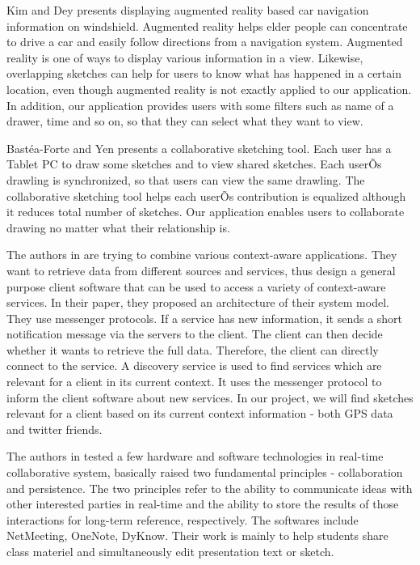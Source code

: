 \documentclass{www2010-submission}
\begin{document}
Kim and Dey \cite{augmented_reality:kim} presents displaying augmented reality
based car navigation information on windshield. Augmented reality helps elder
people can concentrate to drive a car and easily follow directions from a
navigation system. Augmented reality is one of ways to display various
information in a view. Likewise, overlapping sketches can help for users to
know what has happened in a certain location, even though augmented reality is
not exactly applied to our application. In addition, our application provides
users with some filters such as name of a drawer, time and so on, so that they
can select what they want to view.

Bast\'{e}a-Forte and Yen \cite{brainstorming:marcello} presents a collaborative
sketching tool. Each user has a Tablet PC to draw some sketches and to view
shared sketches. Each userÕs drawling is synchronized, so that users can view
the same drawling. The collaborative sketching tool helps each userÕs
contribution is equalized although it reduces total number of sketches. Our
application enables users to collaborate drawing no matter what their
relationship is.

The authors in \cite{context:weis} are trying to combine various context-aware
applications. They want to retrieve data from different sources and services,
thus design a general purpose client software that can be used to access a
variety of context-aware services. In their paper, they proposed an
architecture of their system model. They use messenger protocols. If a service
has new information, it sends a short notification message via the servers to
the client. The client can then decide whether it wants to retrieve the full
data. Therefore, the client can directly connect to the service. A discovery
service is used to find services which are relevant for a client in its current
context. It uses the messenger protocol to inform the client software about new
services. In our project, we will find sketches relevant for a client based on
its current context information - both GPS data and twitter friends.

 The authors in \cite{ink:lindell} tested a few hardware and software
technologies in real-time collaborative system, basically raised two
fundamental principles - collaboration and persistence. The two principles
refer to the ability to communicate ideas with other interested parties in
real-time and the ability to store the results of those interactions for
long-term reference, respectively. The softwares include NetMeeting, OneNote,
DyKnow. Their work is mainly to help students share class materiel and
simultaneously edit presentation text or  sketch.
\end{document}
